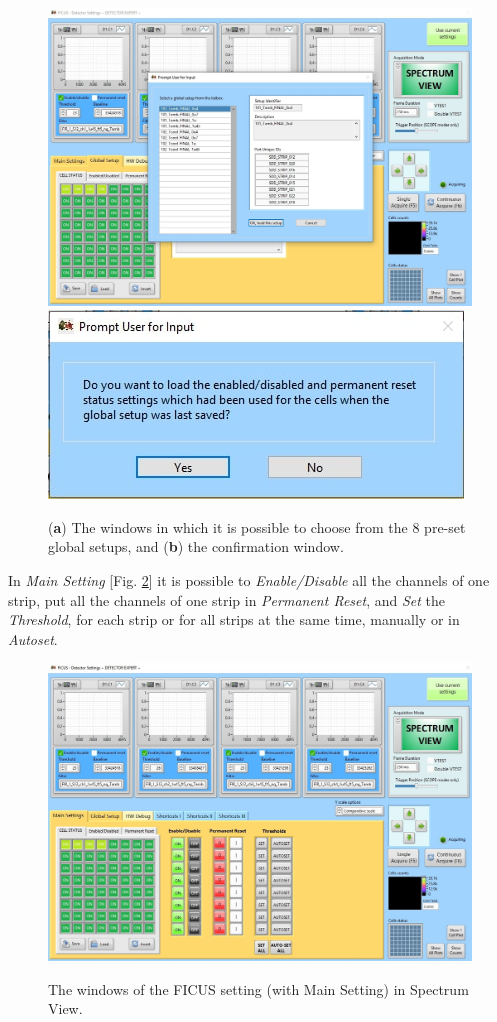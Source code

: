 \documentclass[a4paper,12pt,oneside,pdflatex,italian,final,twocolumn]{article}
\begin{document}
\begin{figure}[h]
\centering
\subfloat
{\includegraphics[width=.85\textwidth]{Capture6.jpg}} \\
\subfloat
{\includegraphics[width=.30\textwidth]{Capture7.jpg}} 
\caption{(\textbf{a}) The windows in which it is possible to choose from the 8 pre-set global setups, and (\textbf{b}) the confirmation window.}\label{fig:fig10}
\end{figure}

In \textit{Main Setting} [Fig. \ref{fig:fig11}] it is possible to \textit{Enable/Disable} all the channels of one strip, put all the channels of one strip in \textit{Permanent Reset}, and \textit{Set} the \textit{Threshold}, for each strip or for all strips at the same time, manually or in \textit{Autoset}.

\begin{figure}[h]
\centering
{\includegraphics[width=.85\textwidth]{Capture9.jpg}} \quad
\caption{The windows of the FICUS setting (with Main Setting) in Spectrum View.}\label{fig:fig11}
\end{figure}
\end{document}
